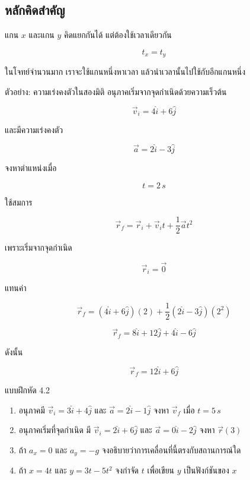 \subsection{หลักคิดสำคัญ}

แกน $x$ และแกน $y$ คิดแยกกันได้ แต่ต้องใช้เวลาเดียวกัน

\[
t_x=t_y
\]

ในโจทย์จำนวนมาก เราจะใช้แกนหนึ่งหาเวลา แล้วนำเวลานั้นไปใช้กับอีกแกนหนึ่ง

\begin{examplebox}{ตัวอย่าง: ความเร่งคงตัวในสองมิติ}
อนุภาคเริ่มจากจุดกำเนิดด้วยความเร็วต้น

\[
\vec{v}_i=4\hat{i}+6\hat{j}
\]

และมีความเร่งคงตัว

\[
\vec{a}=2\hat{i}-3\hat{j}
\]

จงหาตำแหน่งเมื่อ

\[
t=2\,\si{s}
\]

ใช้สมการ

\[
\vec{r}_f=\vec{r}_i+\vec{v}_it+\frac{1}{2}\vec{a}t^2
\]

เพราะเริ่มจากจุดกำเนิด

\[
\vec{r}_i=\vec{0}
\]

แทนค่า

\[
\vec{r}_f=(4\hat{i}+6\hat{j})(2)+\frac{1}{2}(2\hat{i}-3\hat{j})(2^2)
\]

\[
\vec{r}_f=8\hat{i}+12\hat{j}+4\hat{i}-6\hat{j}
\]

ดังนั้น

\[
\vec{r}_f=12\hat{i}+6\hat{j}
\]
\end{examplebox}

\begin{exercisebox}{แบบฝึกหัด 4.2}
\begin{enumerate}
    \item อนุภาคมี $\vec{v}_i=3\hat{i}+4\hat{j}$ และ $\vec{a}=2\hat{i}-1\hat{j}$ จงหา $\vec{v}_f$ เมื่อ $t=5\,\si{s}$
    \item อนุภาคเริ่มที่จุดกำเนิด มี $\vec{v}_i=2\hat{i}+6\hat{j}$ และ $\vec{a}=0\hat{i}-2\hat{j}$ จงหา $\vec{r}(3)$
    \item ถ้า $a_x=0$ และ $a_y=-g$ จงอธิบายว่าการเคลื่อนที่นี้ตรงกับสถานการณ์ใด
    \item ถ้า $x=4t$ และ $y=3t-5t^2$ จงกำจัด $t$ เพื่อเขียน $y$ เป็นฟังก์ชันของ $x$
\end{enumerate}
\end{exercisebox}

